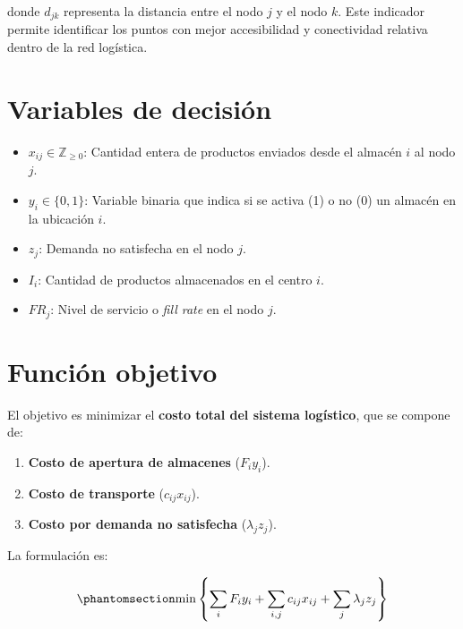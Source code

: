 \documentclass[
  spanish,
  us-letterpaper,
  DIV=11,
  numbers=noendperiod]{scrreprt}
\providecommand{\tightlist}{%
  \setlength{\itemsep}{0pt}\setlength{\parskip}{0pt}}
\numberwithin{equation}{section}
\begin{document}
donde \(d_{jk}\) representa la distancia entre el nodo \(j\) y el nodo
\(k\). Este indicador permite identificar los puntos con mejor
accesibilidad y conectividad relativa dentro de la red logística.

\section{Variables de decisión}\label{variables-de-decisiuxf3n}

\begin{itemize}
\tightlist
\item
  \(x_{ij} \in \mathbb{Z}_{\geq 0}\): Cantidad entera de productos
  enviados desde el almacén \(i\) al nodo \(j\).\\
\item
  \(y_i \in \{0,1\}\): Variable binaria que indica si se activa (1) o no
  (0) un almacén en la ubicación \(i\).\\
\item
  \(z_j\): Demanda no satisfecha en el nodo \(j\).\\
\item
  \(I_i\): Cantidad de productos almacenados en el centro \(i\).\\
\item
  \(FR_j\): Nivel de servicio o \emph{fill rate} en el nodo \(j\).
\end{itemize}

\section{Función objetivo}\label{funciuxf3n-objetivo}

El objetivo es minimizar el \textbf{costo total del sistema logístico},
que se compone de:

\begin{enumerate}
\def\labelenumi{\arabic{enumi}.}
\tightlist
\item
  \textbf{Costo de apertura de almacenes} (\(F_i y_i\)).\\
\item
  \textbf{Costo de transporte} (\(c_{ij} x_{ij}\)).\\
\item
  \textbf{Costo por demanda no satisfecha} (\(\lambda_j z_j\)).
\end{enumerate}

La formulación es:

\begin{equation}\phantomsection\label{eq-PBHE_completa}{
\min \left\{ \sum_{i} F_i y_i + \sum_{i,j} c_{ij} x_{ij} + \sum_j \lambda_j z_j \right\} 
}\end{equation}
\end{document}
